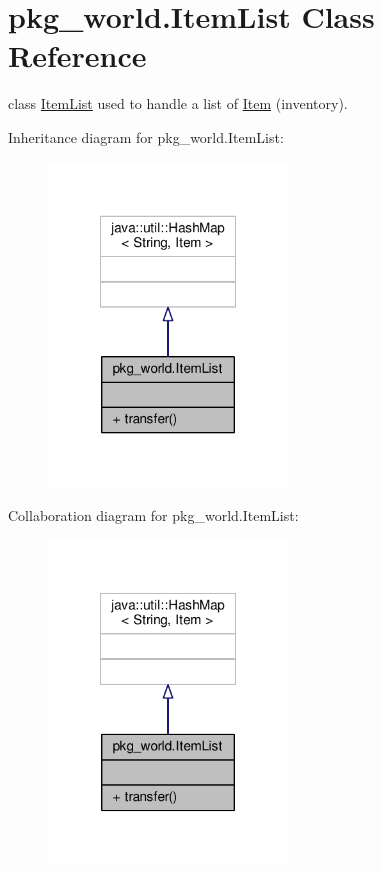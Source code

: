 \hypertarget{classpkg__world_1_1ItemList}{\section{pkg\-\_\-world.\-Item\-List Class Reference}
\label{classpkg__world_1_1ItemList}
}


class \hyperlink{classpkg__world_1_1ItemList}{Item\-List} used to handle a list of \hyperlink{classpkg__world_1_1Item}{Item} (inventory).  




Inheritance diagram for pkg\-\_\-world.\-Item\-List\-:\nopagebreak
\begin{figure}[H]
\begin{center}
\leavevmode
\includegraphics[width=180pt]{classpkg__world_1_1ItemList__inherit__graph}
\end{center}
\end{figure}


Collaboration diagram for pkg\-\_\-world.\-Item\-List\-:\nopagebreak
\begin{figure}[H]
\begin{center}
\leavevmode
\includegraphics[width=180pt]{classpkg__world_1_1ItemList__coll__graph}
\end{center}
\end{figure}
